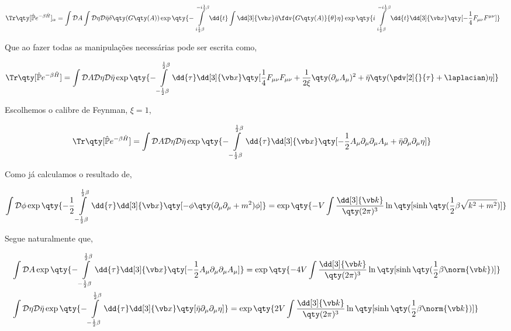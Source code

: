 \documentclass[twoside]{amsart}
\numberwithin{equation}{section}
\newcommand{\Dd}[1]{\mathcal D #1}
\begin{document}
\begin{refsection}
\begin{align}
    \Tr\qty[\hat{\mathbb P}e^{-\beta\hat H}]_\alpha&=\int\Dd{A}\int\Dd{\eta}\Dd{\bar\eta}\delta\qty(G\qty(A))\exp\qty{-\int\limits_{i\frac12\beta}^{-i\frac12\beta}\dd{t}\int\dd[3]{\vb x}\bar\eta\fdv{G\qty(A)}{\theta}\eta}\exp\qty{i\int\limits_{i\frac12\beta}^{-i\frac12\beta}\dd{t}\dd[3]{\vb x}\qty[-\frac14F_{\mu\nu}F^{\mu\nu}]}
\end{align}

Que ao fazer todas as manipulações necessárias pode ser escrita como,

\begin{align}
    \Tr\qty[\hat{\mathbb P}e^{-\beta\hat H}]&=\int\Dd{A}\Dd{\eta}\Dd{\bar\eta}\exp\qty{-\int\limits_{-\frac12\beta}^{\frac12\beta}\dd{\tau}\dd[3]{\vb x}\qty[\frac14F_{\mu\nu}F_{\mu\nu}+\frac{1}{2\xi}\qty(\partial_\mu A_\mu)^2+\bar\eta\qty(\pdv[2]{}{\tau}+\laplacian)\eta]}
\end{align}

Escolhemos o calibre de Feynman, $\xi=1$,

\begin{align}
    \Tr\qty[\hat{\mathbb P}e^{-\beta\hat H}]&=\int\Dd{A}\Dd{\eta}\Dd{\bar\eta}\exp\qty{-\int\limits_{-\frac12\beta}^{\frac12\beta}\dd{\tau}\dd[3]{\vb x}\qty[-\frac12A_{\mu}\partial_\mu\partial_\mu A_\mu+\bar\eta\partial_\mu \partial_\mu \eta]}
\end{align}

Como já calculamos o resultado de,

\begin{align}
    \int\Dd{\phi}\exp\qty{-\frac12\int\limits_{-\frac12\beta}^{\frac12\beta}\dd{\tau}\dd[3]{\vb x}\qty[-\phi\qty(\partial_\mu\partial_\mu+m^2)\phi]}=\exp\qty{-V\int\frac{\dd[3]{\vb k}}{\qty(2\pi)^3}\ln\qty[\sinh\qty(\frac12\beta\sqrt{k^2+m^2})]}
\end{align}

Segue naturalmente que,

\begin{align}
    &\int\Dd{A}\exp\qty{-\int\limits_{-\frac12\beta}^{\frac12\beta}\dd{\tau}\dd[3]{\vb x}\qty[-\frac12A_{\mu}\partial_\mu\partial_\mu A_\mu]}=\exp\qty{-4V\int\frac{\dd[3]{\vb k}}{\qty(2\pi)^3}\ln\qty[\sinh\qty(\frac12\beta\norm{\vb k})]}\\
    &\int\Dd{\eta}\Dd{\bar\eta}\exp\qty{-\int\limits_{-\frac12\beta}^{\frac12\beta}\dd{\tau}\dd[3]{\vb x}\qty[\bar\eta\partial_\mu \partial_\mu \eta]}=\exp\qty{2V\int\frac{\dd[3]{\vb k}}{\qty(2\pi)^3}\ln\qty[\sinh\qty(\frac12\beta\norm{\vb k})]}
\end{align}

\printbibliography[heading=subbibliography]
\end{refsection}
\end{document}
